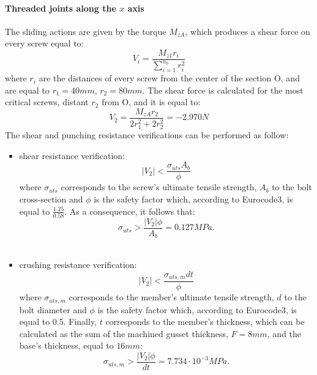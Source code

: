 \paragraph{Threaded joints along the $x$ axis} The sliding actions are given by the torque $M_{zA}$, which produces a shear force on every screw equal to:\\
\begin{equation*}
    V_{i} = \frac{M_{z1}r_{i}}{\sum\limits_{i=1}^{n_{{b}}} r^2_{i}}
\end{equation*}
where $r_{i}$ are the distances of every screw from the center of the section O, and are equal to $r_{1} = 40 mm$, $r_{2} = 80 mm$. 
The shear force is calculated for the most critical screws, distant $r_{2}$ from O, and it is equal to:\\
\begin{equation*}
    V_{2} = \frac{M_{zA}r_{2}}{2r^2_{1}+2r^2_{2}} = - 2.970 N
\end{equation*}
The shear and punching resistance verifications can be performed as follow:
\begin{itemize}
    \item shear resistance verification:
    \begin{equation*}
        |V_{2}| < \frac{\sigma_{uts}A_{b}}{\phi}
    \end{equation*}
    where $\sigma_{uts}$ corresponds to the screw's ultimate tensile strength, $A_{b}$ to the bolt cross-section and $\phi$ is the safety factor which, according to Eurocode3, is equal to $\frac{1.25}{0.58}$.
    As a consequence, it follows that:
    \begin{equation*}
       \sigma_{uts} > \frac{|V_{2}|\phi}{A_{b}} = 0.127 MPa.
    \end{equation*}\\
    \item crushing resistance verification:
    \begin{equation*}
        |V_{2}| < \frac{\sigma_{uts,m}dt}{\phi}
    \end{equation*}
    where $\sigma_{uts,m}$ corresponds to the member's ultimate tensile strength, $d$ to the bolt diameter and $\phi$ is the safety factor which, according to Eurocode3, is equal to 0.5. Finally, $t$ corresponds to the member's thickness, which can be calculated as the sum of the machined gusset thickness, $F = 8 mm$, and the base's thickness, equal to $16 mm$:
     \begin{equation*}
       \sigma_{uts,m} > \frac{|V_{2}|\phi}{dt} = 7.734 \cdot 10^{-3} MPa.
    \end{equation*}
\end{itemize}
